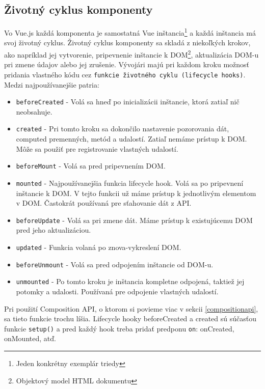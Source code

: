 \subsection*{Životný cyklus komponenty}
Vo Vue.js každá komponenta je samostatná Vue inštancia\footnote{Jeden konkrétny exemplár triedy} a každá inštancia má svoj životný cyklus. Životný cyklus komponenty sa skladá z niekoľkých krokov, ako napríklad jej vytvorenie, pripevnenie inštancie k DOM\footnote{Objektový model HTML dokumentu}, aktualizácia DOM-u pri zmene údajov alebo jej zrušenie. Vývojári majú pri každom kroku možnosť pridania vlastného kódu cez \texttt{funkcie životného cyklu (lifecycle hooks)}. Medzi najpoužívanejšie patria:
    \begin{itemize}
        \item\texttt{beforeCreated} - Volá sa hneď po inicializácii inštancie, ktorá zatiaľ nič neobsahuje.
        \item\texttt{created} - Pri tomto kroku sa dokončilo nastavenie pozorovania dát, computed premenných, metód a udalostí. Zatiaľ nemáme prístup k DOM. Môže sa použiť pre registrovanie vlastných udalostí.
        \item\texttt{beforeMount} - Volá sa pred pripevnením DOM.
        \item\texttt{mounted} - Najpoužívanejšia funkcia lifecycle hook. Volá sa po pripevnení inštancie k DOM. V tejto funkcii už máme prístup k jednotlivým elementom v DOM. Častokrát používaná pre sťahovanie dát z API.
        \item\texttt{beforeUpdate} - Volá sa pri zmene dát. Máme prístup k existujúcemu DOM pred jeho aktualizáciou.
        \item\texttt{updated} - Funkcia volaná po znova-vykreslení DOM.
        \item\texttt{beforeUnmount} - Volá sa pred odpojením inštancie od DOM-u.
        \item\texttt{unmounted} - Po tomto kroku je inštancia kompletne odpojená, taktiež jej potomky a udalosti. Používaná pre odpojenie vlastných udalostí.
    \end{itemize}

Pri použití Composition API, o ktorom si povieme viac v sekcii \ref{compositionapi}, sa tieto funkcie trochu líšia. Lifecycle hooky beforeCreated a created sú súčasťou funkcie \texttt{setup()} a pred každý hook treba pridať predponu \texttt{on}: onCreated, onMounted, atď. 

